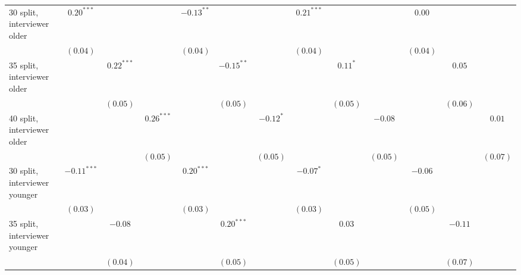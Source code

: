 \begin{table}
\begin{center}
\begin{threeparttable}
\begin{tabular}{l c c c c c c c c c c c c}
30 split, interviewer older     & $0.20^{***}$  &               &               & $-0.13^{**}$  &               &               & $0.21^{***}$  &               &               & $0.00$        &               &               \\
                                & $(0.04)$      &               &               & $(0.04)$      &               &               & $(0.04)$      &               &               & $(0.04)$      &               &               \\
35 split, interviewer older     &               & $0.22^{***}$  &               &               & $-0.15^{**}$  &               &               & $0.11^{*}$    &               &               & $0.05$        &               \\
                                &               & $(0.05)$      &               &               & $(0.05)$      &               &               & $(0.05)$      &               &               & $(0.06)$      &               \\
40 split, interviewer older     &               &               & $0.26^{***}$  &               &               & $-0.12^{*}$   &               &               & $-0.08$       &               &               & $0.01$        \\
                                &               &               & $(0.05)$      &               &               & $(0.05)$      &               &               & $(0.05)$      &               &               & $(0.07)$      \\
30 split, interviewer younger   & $-0.11^{***}$ &               &               & $0.20^{***}$  &               &               & $-0.07^{*}$   &               &               & $-0.06$       &               &               \\
                                & $(0.03)$      &               &               & $(0.03)$      &               &               & $(0.03)$      &               &               & $(0.05)$      &               &               \\
35 split, interviewer younger   &               & $-0.08$       &               &               & $0.20^{***}$  &               &               & $0.03$        &               &               & $-0.11$       &               \\
                                &               & $(0.04)$      &               &               & $(0.05)$      &               &               & $(0.05)$      &               &               & $(0.07)$      &               \\

\end{tabular}
\end{threeparttable}
\end{center}
\end{table}
